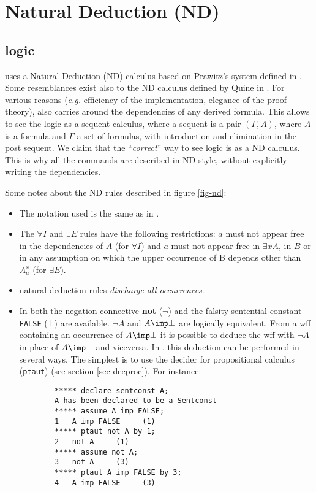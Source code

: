 \section{Natural Deduction (ND)}
\label{sec-nd}
\label{sec-nd-first}

\subsection{{\GF} logic}
\label{sec-ndrules}

{\GF} uses a Natural Deduction (ND) calculus based on Prawitz's system
defined in \cite{prawitz1}.
Some resemblances exist also to the ND calculus defined by Quine in
\cite{quine3}.
For various reasons ({\it e.g.} efficiency of the implementation, elegance of
the proof theory), {\GF} also carries around the dependencies of any derived
formula.
This allows to see the {\GF} logic as a sequent calculus, where a sequent is a
pair $(\Gamma, A)$, where $A$ is a formula and $\Gamma$ a set of formulas, with
introduction and elimination in the post sequent.
We claim that the ``{\em correct}'' way to see {\GF} logic is as a ND calculus.
This is why all the commands are described in ND style, without explicitly
writing the dependencies.

Some notes about the ND rules described in figure \ref{fig-nd}:

\begin{itemize}
\item
	The notation used is the same as in \cite{prawitz1}.
\item
	The $\forall I$ and $\exists E$ rules have the following restrictions:
	$a$ must not appear free in the dependencies of $A$ (for $\forall I$)
	and $a$ must not appear free in $\exists x A$, in $B$  or in any assumption
	on which the upper occurrence of B depends other than $A^{x}_{a}$ (for
	$\exists E$).
\item
	{\GF} natural deduction rules {\em discharge all occurrences}.
\item
	In {\GF} both the negation connective {\bf not} ($\neg$) and the falsity
	sentential constant {\tt FALSE} ($\bot$) are available.
	$\neg A$ and $A \imp \bot$ are logically equivalent.
	From a wff containing an occurrence of $A \imp \bot$ it is possible to
	deduce the wff with $\neg A$ in place of $A \imp \bot$ and viceversa.
	In {\GF}, this deduction can be performed in several ways.
	The simplest is to use the decider for propositional calculus ({\tt ptaut})
	(see section \ref{sec-decproc}).
	For instance:
	\begin{verbatim}
		***** declare sentconst A;
		A has been declared to be a Sentconst
		***** assume A imp FALSE;
		1   A imp FALSE     (1)
		***** ptaut not A by 1;
		2   not A     (1)
		***** assume not A;
		3   not A     (3)
		***** ptaut A imp FALSE by 3;
		4   A imp FALSE     (3)
	\end{verbatim}
\end{itemize}



